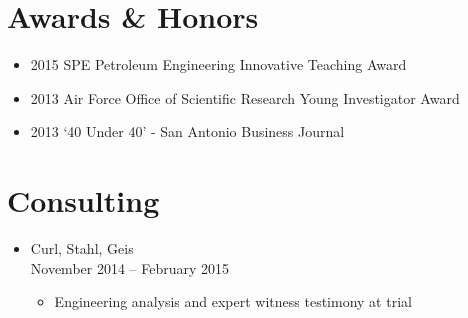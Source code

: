 \section*{Awards \& Honors}

\begin{itemize}
    \item 2015 SPE Petroleum Engineering Innovative Teaching Award 
    \item 2013 Air Force Office of Scientific Research Young Investigator Award
    \item 2013 `40 Under 40' - San Antonio Business Journal
\end{itemize}


\ifdefined\ispdf
\section*{Consulting}

\begin{itemize}
    \item Curl, Stahl, Geis \\
          November 2014 -- February 2015
    \begin{itemize}
        \item Engineering analysis and expert witness testimony at trial
    \end{itemize}
\end{itemize}
\fi
\fi

